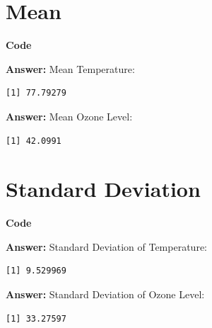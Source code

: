 \documentclass[
  letterpaper,
]{book}
\newenvironment{Shaded}{\begin{snugshade}}{\end{snugshade}}
\newcommand{\FunctionTok}[1]{\textcolor[rgb]{0.28,0.35,0.67}{#1}}
\newcommand{\NormalTok}[1]{\textcolor[rgb]{0.00,0.23,0.31}{#1}}
\newcommand{\OtherTok}[1]{\textcolor[rgb]{0.00,0.23,0.31}{#1}}
\newcommand{\SpecialCharTok}[1]{\textcolor[rgb]{0.37,0.37,0.37}{#1}}
\begin{document}
\section{Mean}\label{mean}

\textbf{Code}

\begin{Shaded}
\end{Shaded}

\textbf{Answer:} Mean Temperature:

\begin{verbatim}
[1] 77.79279
\end{verbatim}

\textbf{Answer:} Mean Ozone Level:

\begin{verbatim}
[1] 42.0991
\end{verbatim}

\section{Standard Deviation}\label{standard-deviation}

\textbf{Code}

\begin{Shaded}
\end{Shaded}

\textbf{Answer:} Standard Deviation of Temperature:

\begin{verbatim}
[1] 9.529969
\end{verbatim}

\textbf{Answer:} Standard Deviation of Ozone Level:

\begin{verbatim}
[1] 33.27597
\end{verbatim}
\end{document}
